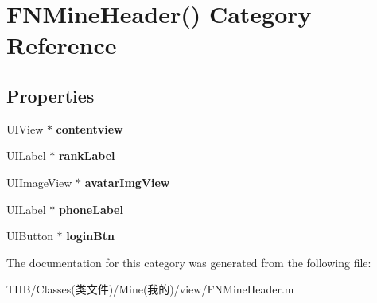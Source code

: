 \hypertarget{category_f_n_mine_header_07_08}{}\section{F\+N\+Mine\+Header() Category Reference}
\label{category_f_n_mine_header_07_08}
\subsection*{Properties}
\begin{DoxyCompactItemize}
\item 
\mbox{\label{category_f_n_mine_header_07_08_aebdd06b8a382495564f44854c47ab021}} 
U\+I\+View $\ast$ {\bfseries contentview}
\item 
\mbox{\label{category_f_n_mine_header_07_08_ae22fabbaa863aa9105b38fd38c1d6a0b}} 
U\+I\+Label $\ast$ {\bfseries rank\+Label}
\item 
\mbox{\label{category_f_n_mine_header_07_08_abbaaac2f153c81009a700eff2039ea74}} 
U\+I\+Image\+View $\ast$ {\bfseries avatar\+Img\+View}
\item 
\mbox{\label{category_f_n_mine_header_07_08_a701e50c3013328dda8006e4ceaf1b165}} 
U\+I\+Label $\ast$ {\bfseries phone\+Label}
\item 
\mbox{\label{category_f_n_mine_header_07_08_aa964613d06506a186eeec1a704738883}} 
U\+I\+Button $\ast$ {\bfseries login\+Btn}
\end{DoxyCompactItemize}


The documentation for this category was generated from the following file\+:\begin{DoxyCompactItemize}
\item 
T\+H\+B/\+Classes(类文件)/\+Mine(我的)/view/F\+N\+Mine\+Header.\+m\end{DoxyCompactItemize}

